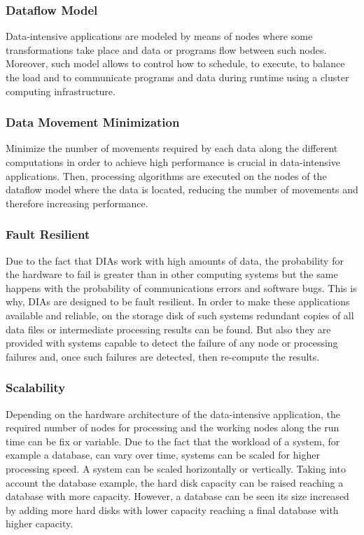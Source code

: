\subsubsection*{Dataflow Model}

Data-intensive applications are modeled by means of nodes where some transformations take place and data or programs flow between such nodes. Moreover, such model allows to control how to schedule, to execute, to balance the load and to communicate programs and data during runtime using a cluster computing infrastructure.

\subsubsection*{Data Movement Minimization}

Minimize the number of movements required by each data along the different computations in order to achieve high performance is crucial in data-intensive applications. Then, processing algorithms are executed on the nodes of the dataflow model where the data is located, reducing the number of movements and therefore increasing performance.

\subsubsection*{Fault Resilient}

Due to the fact that DIAs work with high amounts of data, the probability for the hardware to fail is greater than in other computing systems but the same happens with the probability of communications errors and software bugs. This is why, DIAs are designed to be fault resilient. In order to make these applications available and reliable, on the storage disk of such systems redundant copies of all data files or intermediate processing results can be found. But also they are provided with systems capable to detect the failure of any node or processing failures and, once such failures are detected, then re-compute the results.

\subsubsection*{Scalability}

Depending on the hardware architecture of the data-intensive application, the required number of nodes for processing and the working nodes along the run time can be fix or variable. Due to the fact that the workload of a system, for example a database, can vary over time, systems can be scaled for higher processing speed. A system can be scaled horizontally or vertically. Taking into account the database example, the hard disk capacity can be raised reaching a database with more capacity. However, a database can be seen its size increased by adding more hard disks with lower capacity reaching a final database with higher capacity.

